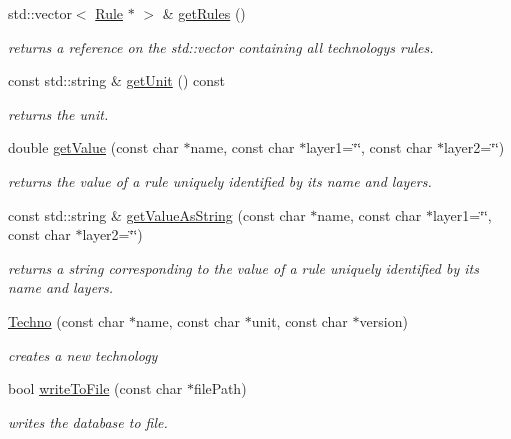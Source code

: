 \begin{DoxyCompactItemize}
std\+::vector$<$ \hyperlink{class_d_t_r_1_1_rule}{Rule} $\ast$ $>$ \& \hyperlink{class_d_t_r_1_1_techno_ac322d0479195cd8a65ff5a922b7f2af7}{get\+Rules} ()
\begin{DoxyCompactList}\small\item\em returns a reference on the std\+::vector containing all technology\textquotesingle{}s rules. \end{DoxyCompactList}\item 
\mbox{\label{class_d_t_r_1_1_techno_a42e12e8f890c03ebf12e754d7e489dcb}} 
const std\+::string \& \hyperlink{class_d_t_r_1_1_techno_a42e12e8f890c03ebf12e754d7e489dcb}{get\+Unit} () const
\begin{DoxyCompactList}\small\item\em returns the unit. \end{DoxyCompactList}\item 
double \hyperlink{class_d_t_r_1_1_techno_ac08e2e60dd16750551221ca908001057}{get\+Value} (const char $\ast$name, const char $\ast$layer1=\char`\"{}\char`\"{}, const char $\ast$layer2=\char`\"{}\char`\"{})
\begin{DoxyCompactList}\small\item\em returns the value of a rule uniquely identified by its name and layers. \end{DoxyCompactList}\item 
const std\+::string \& \hyperlink{class_d_t_r_1_1_techno_ad5ef5b8e444ab7a86a2e3bff7762c956}{get\+Value\+As\+String} (const char $\ast$name, const char $\ast$layer1=\char`\"{}\char`\"{}, const char $\ast$layer2=\char`\"{}\char`\"{})
\begin{DoxyCompactList}\small\item\em returns a string corresponding to the value of a rule uniquely identified by its name and layers. \end{DoxyCompactList}\item 
\hyperlink{class_d_t_r_1_1_techno_a25c6aecdd011d09618908626192c933f}{Techno} (const char $\ast$name, const char $\ast$unit, const char $\ast$version)
\begin{DoxyCompactList}\small\item\em creates a new technology \end{DoxyCompactList}\item 
bool \hyperlink{class_d_t_r_1_1_techno_a26b05539dd3345963b8708788b82e2cb}{write\+To\+File} (const char $\ast$file\+Path)
\begin{DoxyCompactList}\small\item\em writes the database to file. \end{DoxyCompactList}\end{DoxyCompactItemize}
